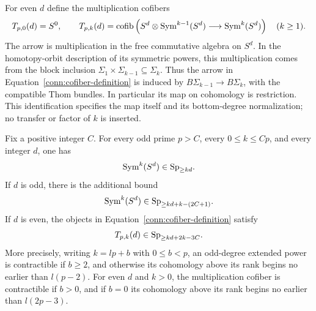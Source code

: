 For even $d$ define the multiplication cofibers
\begin{equation}\label{conn:cofiber-definition}
 T_{p,0}(d)=S^0,\qquad
 T_{p,k}(d)=\operatorname{cofib}\left(
 S^d\otimes\operatorname{Sym}^{k-1}(S^d)
 \longrightarrow\operatorname{Sym}^k(S^d)\right)\quad(k\geq1).
\end{equation}
The arrow is multiplication in the free commutative algebra on
$S^d$. In the homotopy-orbit description of its symmetric powers,
this multiplication comes from the block inclusion
$\Sigma_1\times\Sigma_{k-1}\subseteq\Sigma_k$. Thus the arrow in
Equation~\eqref{conn:cofiber-definition} is induced by
$B\Sigma_{k-1}\to B\Sigma_k$, with the compatible Thom bundles.
In particular its map on cohomology is restriction. This
identification specifies the map itself and its bottom-degree
normalization; no transfer or factor of $k$ is inserted.

\begin{proposition}\label{conn:symmetric}
Fix a positive integer $C$. For every odd prime $p>C$, every
$0\leq k\leq Cp$, and every integer $d$, one has
\[
 \operatorname{Sym}^k(S^d)\in\mathrm{Sp}_{\geq kd}.
\]
If $d$ is odd, there is the additional bound
\begin{equation}\label{conn:odd-bound}
 \operatorname{Sym}^k(S^d)\in\mathrm{Sp}_{\geq kd+k-(2C+1)}.
\end{equation}
If $d$ is even, the objects in
Equation~\eqref{conn:cofiber-definition} satisfy
\begin{equation}\label{conn:cofiber-bound}
 T_{p,k}(d)\in\mathrm{Sp}_{\geq kd+2k-3C}.
\end{equation}
More precisely, writing $k=lp+b$ with $0\leq b<p$, an odd-degree
extended power is contractible if $b\geq2$, and otherwise its
cohomology above its rank begins no earlier than $l(p-2)$.
For even $d$ and $k>0$, the multiplication cofiber is contractible
if $b>0$, and if $b=0$ its cohomology above its rank begins no
earlier than $l(2p-3)$.
\end{proposition}

